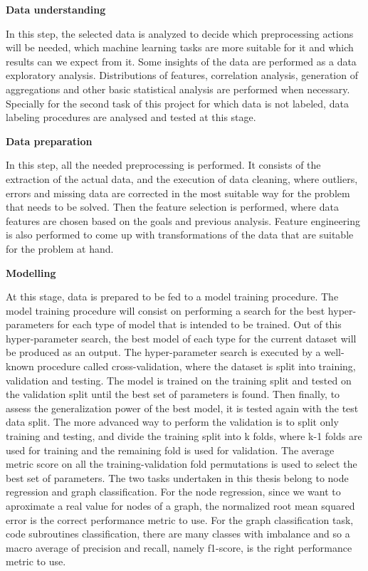 \textbf{Data understanding}

In this step, the selected data is analyzed to decide which preprocessing actions will be needed, which machine learning tasks are more suitable for it and which results can we expect from it. 
Some insights of the data are performed as a data exploratory analysis. Distributions of features, correlation analysis, generation of aggregations and other basic statistical analysis are performed when necessary.
Specially for the second task of this project for which data is not labeled, data labeling procedures are analysed and tested at this stage.

\textbf{Data preparation}

In this step, all the needed preprocessing is performed. It consists of the extraction of the actual data, and the execution of data cleaning, where outliers, errors and missing data are corrected in the most suitable way for the problem that needs to be solved. Then the feature selection is performed, where data features are chosen based on the goals and previous analysis. Feature engineering is also performed to come up with transformations of the data that are suitable for the problem at hand.


\textbf{Modelling}

At this stage, data is prepared to be fed to a model training procedure. The model training procedure will consist on performing a search for the best hyper-parameters for each type of model that is intended to be trained. Out of this hyper-parameter search, the best model of each type for the current dataset will be produced as an output. 
The hyper-parameter search is executed by a well-known procedure called cross-validation, where the dataset is split into training, validation and testing. The model is trained on the training split and tested on the validation split until the best set of parameters is found. Then finally, to assess the generalization power of the best model, it is tested again with the test data split. 
The more advanced way to perform the validation is to split only training and testing, and divide the training split into k folds, where k-1 folds are used for training and the remaining fold is used for validation. The average metric score on all the training-validation fold permutations is used to select the best set of parameters.
The two tasks undertaken in this thesis belong to node regression and graph classification. For the node regression, since we want to aproximate a real value for nodes of a graph, the normalized root mean squared error is the correct performance metric to use. For the graph classification task, code subroutines classification, there are many classes with imbalance and so a macro average of precision and recall, namely f1-score, is the right performance metric to use.

